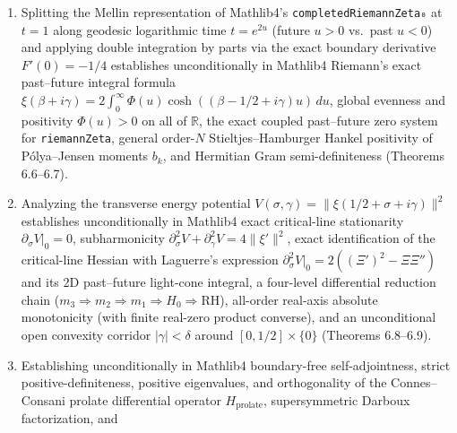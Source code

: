 \documentclass[
  11pt,
]{article}
\begin{document}
\begin{enumerate}
  \(\zeta(x)\) on \((0, 1)\), the \(\mathbb{Q}\)-linear independence of
  \(\{\ln p : p \in \mathbb{P}\}\), the \(L^2(\mathbb{T}^\infty)\)
  critical-line phase-transition boundary, the exact
  Adelic--\(\mathbb{T}^2\) imbalance identity, Jacobi theta modular
  duality, unitarity of the Lax--Phillips modular scattering matrix
  \(\varphi(s) = \xi(2s-1)/\xi(2s)\), and the exact \textbf{Four-Way
  Master Equivalence} between Mathlib4's official
  \texttt{RiemannHypothesis}, \texttt{SpectralBridgeTarget},
  \texttt{AdelicDipolarWeilPositivity}, and
  \texttt{ModularScatteringPoleFree} (Theorems 6.1--6.5 and 6.9).
\item
  Splitting the Mellin representation of Mathlib4's
  \texttt{completedRiemannZeta₀} at \(t = 1\) along geodesic logarithmic
  time \(t = e^{2u}\) (future \(u > 0\) vs.~past \(u < 0\)) and applying
  double integration by parts via the exact boundary derivative
  \(F'(0) = -1/4\) establishes unconditionally in Mathlib4 Riemann's
  exact past--future integral formula
  \(\xi(\beta + i\gamma) = 2\int_0^\infty \Phi(u)\cosh((\beta - 1/2 + i\gamma)u)\,du\),
  global evenness and positivity \(\Phi(u) > 0\) on all of
  \(\mathbb{R}\), the exact coupled past--future zero system for
  \texttt{riemannZeta}, general order-\(N\) Stieltjes--Hamburger Hankel
  positivity of Pólya--Jensen moments \(b_k\), and Hermitian Gram
  semi-definiteness (Theorems 6.6--6.7).
\item
  Analyzing the transverse energy potential
  \(V(\sigma, \gamma) = \|\xi(1/2 + \sigma + i\gamma)\|^2\) establishes
  unconditionally in Mathlib4 exact critical-line stationarity
  \(\partial_\sigma V|_{0} = 0\), subharmonicity
  \(\partial_\sigma^2 V + \partial_\gamma^2 V = 4\|\xi'\|^2\), exact
  identification of the critical-line Hessian with Laguerre's expression
  \(\partial_\sigma^2 V|_{0} = 2((\Xi')^2 - \Xi\Xi'')\) and its 2D
  past--future light-cone integral, a four-level differential reduction
  chain
  (\(m_3 \Rightarrow m_2 \Rightarrow m_1 \Rightarrow H_0 \Rightarrow \mathrm{RH}\)),
  all-order real-axis absolute monotonicity (with finite real-zero
  product converse), and an unconditional open convexity corridor
  \(|\gamma| < \delta\) around \([0, 1/2] \times \{0\}\) (Theorems
  6.8--6.9).
\item
  Establishing unconditionally in Mathlib4 boundary-free
  self-adjointness, strict positive-definiteness, positive eigenvalues,
  and orthogonality of the Connes--Consani prolate differential operator
  \(H_{\text{prolate}}\), supersymmetric Darboux factorization, and

\end{enumerate}
\end{document}
